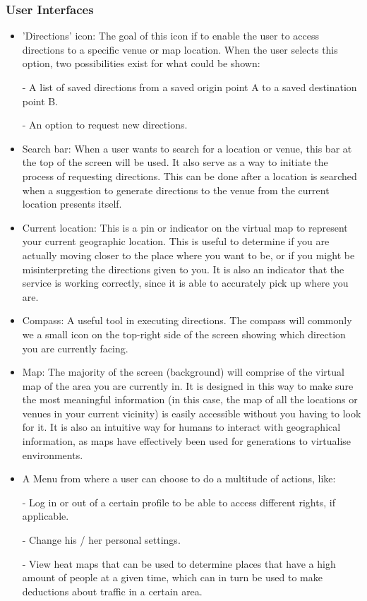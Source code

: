 \documentclass[runningheads,a4paper]{article}
\begin{document}
\subsubsection{User Interfaces}
\begin{itemize}

	\item 'Directions' icon: The goal of this icon if to enable the user to access directions to a specific venue or map location. When the user selects this option, two possibilities exist for what could be shown:
	
    	\tab - A list of saved directions from a saved origin point A to a saved destination point B.
    	
    	\tab - An option to request new directions.
	
	\item Search bar: When a user wants to search for a location or venue, this bar at the top of the screen will be used. It also serve as a way to initiate the process of requesting directions. This can be done after a location is searched when a suggestion to generate directions to the venue from the current location presents itself.
	
	\item Current location: This is a pin or indicator on the virtual map to represent your current geographic location. This is useful to determine if you are actually moving closer to the place where you want to be, or if you might be misinterpreting the directions given to you. It is also an indicator that the service is working correctly, since it is able to accurately pick up where you are.
	
	\item Compass: A useful tool in executing directions. The compass will commonly we a small icon on the top-right side of the screen showing which direction you are currently facing.
	
	\item Map: The majority of the screen (background) will comprise of the virtual map of the area you are currently in. It is designed in this way to make sure the most meaningful information (in this case, the map of all the locations or venues in your current vicinity) is easily accessible without you having to look for it. It is also an intuitive way for humans to interact with geographical information, as maps have effectively been used for generations to virtualise environments.
	
	\item A Menu from where a user can choose to do a multitude of actions, like:
	    
	    \tab - Log in or out of a certain profile to be able to access different rights, if applicable.
	
	    \tab - Change his / her personal settings.
	
	    \tab - View heat maps that can be used to determine places that have a high amount of people at a given time, which can in turn be used to make deductions about traffic in a certain area.
	
\end{itemize}
\end{document}
